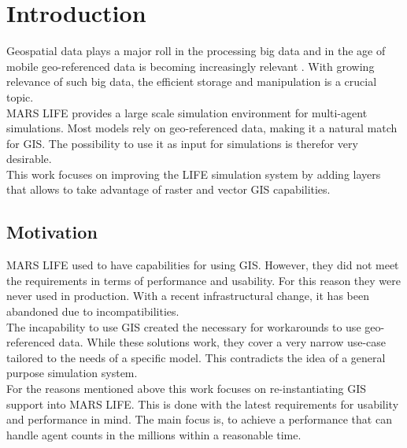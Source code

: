 
\chapter{Introduction}
Geospatial data plays a major roll in the processing big data and in the age of mobile geo-referenced data is becoming increasingly relevant \citep{Lee2015, Kitchin2013, Graham2013}. With growing relevance of such big data, the efficient storage and manipulation is a crucial topic.\\
MARS LIFE provides a large scale simulation environment for multi-agent simulations. Most models rely on geo-referenced data, making it a natural match for GIS. The possibility to use it as input for simulations is therefor very desirable.\\
This work focuses on improving the LIFE simulation system by adding layers that allows to take advantage of raster and vector GIS capabilities.



\section{Motivation}
MARS LIFE used to have capabilities for using GIS. However, they did not meet the requirements in terms of performance and usability. For this reason they were never used in production. With a recent infrastructural change, it has been abandoned due to incompatibilities.\\
The incapability to use GIS created the necessary for workarounds to use geo-referenced data. While these solutions work, they cover a very narrow use-case tailored to the needs of a specific model. This contradicts the idea of a general purpose simulation system.\\
For the reasons mentioned above this work focuses on re-instantiating GIS support into MARS LIFE. This is done with the latest requirements for usability and performance in mind. The main focus is, to achieve a performance that can handle agent counts in the millions within a reasonable time.
